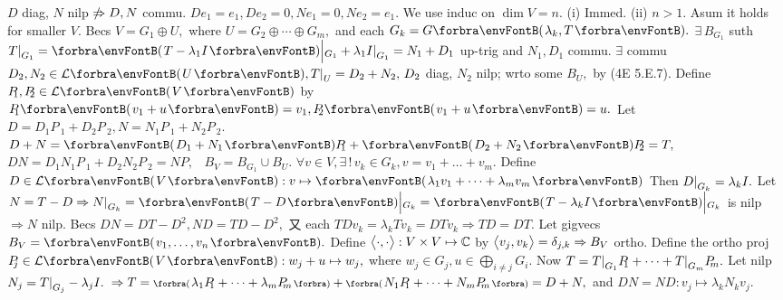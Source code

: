 

\ANote $D$ diag, $N$ nilp $\notRightarrow D,N$ commu. \AExa $De_1=e_1,De_2=0,Ne_1=0,Ne_2=e_1.$ %
\vspace{2pt}\parSol{}
We use induc on $\dim V=n.$ (i) Immed. (ii) $n>1.$ Asum it holds for smaller $V.$\parSol{}
Becs $V=G_1\oplus U,$ where $U=G_2\oplus\cdots\oplus G_m,$ and each $G_k=G\Par{\lambda_k,T}.$\parSol{}
$\exists\,B_{G_1}$ suth $T\mmid_{G_1}=\Par{T-\lambda_1I}\Big|{_{G_1}}+\lambda_1I\mmid_{G_1}=N_1+D_1$ up-trig and $N_1,D_1$ commu.\parSol{}
$\exists$ commu $D_2,N_2\in\Lm{U},T\mmid_U=D_2+N_2,\,D_2$ diag, $N_2$ nilp; wrto some $B_U,$ by (4E 5.E.7).\parSol{}
Define $P_{\!\!\!\:1},P_{\!\!\!\:2}\in\Lm{V}$ by $P_{\!\!\!\:1}\Par{v_1+u}=v_1,P_{\!\!\!\:2}\Par{v_1+u}=u.$ Let $D=D_1P_{\!\!\!\:1}+D_2P_{\!\!\!\:2},N=N_1P_{\!\!\!\:1}+N_2P_{\!\!\!\:2}.$\parSol{}
$D+N=\Par{D_1+N_1}P_{\!\!\!\:1}+\Par{D_2+N_2}P_{\!\!\!\:2}=T,$ \, $DN=D_1N_1P_{\!\!\!\:1}+D_2N_2P_{\!\!\!\:2}=NP,$ \, $B_V=B_{G_1}\cup B_U.$\PfEnd\vspace{4pt}\parSol{}
\Or $\forall v\in V,\exists\,!\,v_k\in G_k,v=v_1+\dots+v_m.$ Define $D\in\Lm{V}:v\mapsto\Par{\lambda_1v_1+\dots+\lambda_mv_m}$\parSol{}
Then $D\text{\normalsize|}_{G_k}=\lambda_kI.$ Let $N=T-D\Rightarrow N\mmid_{G_k}=\Par{T-D}\Big|{_{G_k}}=\Par{T-\lambda_kI}\Big|{_{G_k}}$ is nilp $\Rightarrow N$ nilp.\parSol{}
Becs $DN=DT-D^2,ND=TD-D^2,$ 又 each $TDv_k=\lambda_kTv_k=DTv_k\Rightarrow TD=DT.$\PfEnd\vspace{4pt}\parSol{}
\Or Let gigvecs $B_V=\Par{v_1,\dots,v_n}.$ Define $\big\langle{\cdot,\cdot}\big\rangle:V\times V\mapsto{\mathbb{C}}$ by $\big\langle{v_j,v_k}\big\rangle=\delta_{j,k}\Rightarrow B_V$ ortho.\parSol{}
Define the ortho proj $P_{\!\!\!\:j}\in\Lm{V}:w_j+u\mapsto w_j,$ where $w_j\in G_j,u\in\bigoplus_{i\neq j}G_i.$\parSol{}
Now $T=T\text{\normalsize|}_{G_1}P_{\!\!\!\:1}+\dots+T\text{\normalsize|}_{G_m}P_{\!\!\!\:m}.$ Let nilp $N_j=T\text{\normalsize|}_{G_j}-\lambda_jI.$\parSol{}
$\Rightarrow T=\BigPar{\lambda_1P_{\!\!\!\:1}+\dots+\lambda_mP_{\!\!\!\:m}}+\BigPar{N_1P_{\!\!\!\:1}+\dots+N_mP_{\!\!\!\:m}}=D+N,$ and $DN=ND:v_j\mapsto\lambda_kN_kv_j.$\PfEnd
\SepLine\pagebreak


